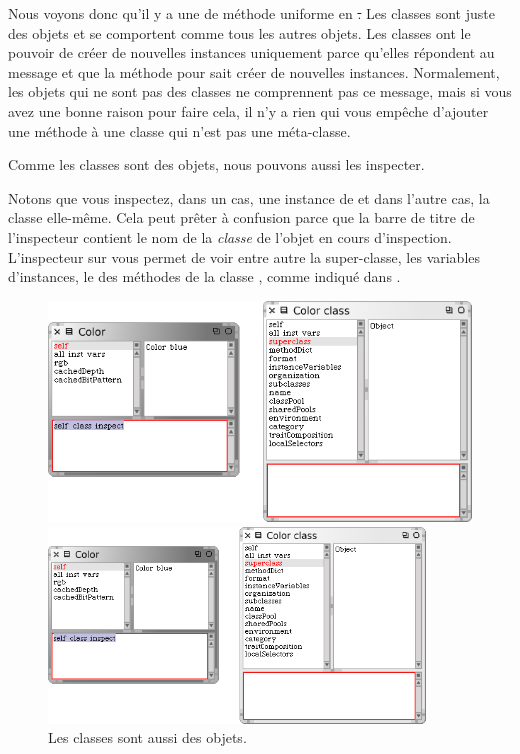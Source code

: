 \documentclass[a4paper,10pt,twoside]{book}
\begin{document}
Nous voyons donc qu'il y a une  de méthode uniforme en \st.
Les classes sont juste des objets et se comportent comme tous les autres objets.
Les classes ont le pouvoir de créer de nouvelles instances uniquement parce qu'elles répondent au message  et que la méthode pour  sait créer de nouvelles instances.
Normalement, les objets qui ne sont pas des classes ne comprennent pas
ce message, mais si vous avez une bonne raison pour faire cela, il n'y a rien qui vous empêche d'ajouter une méthode  à une classe qui n'est pas une méta-classe.

Comme les classes sont des objets, nous pouvons aussi les inspecter.


\noindent
Notons que vous inspectez, dans un cas, une instance de  et
dans l'autre cas, la classe  elle-même.
Cela peut prêter à confusion parce que la barre de titre de l'inspecteur contient le nom de la \emph{classe} de l'objet en cours d'inspection.
L'inspecteur sur  vous permet de voir 
entre autre
la super-classe, les variables d'instances, le  des méthodes 
de  la classe , comme indiqu\'e dans .

\begin{center}
\begin{figure}[!ht]
\ifluluelse
	{\centerline{\includegraphics[width=\textwidth]{InspectingColor}}}
	{\centerline{\includegraphics[width=10cm]{InspectingColor}}}
\caption{Les classes sont aussi des objets.\label{fig:inspectingColor}}
\end{figure}
\end{center}
\end{document}
